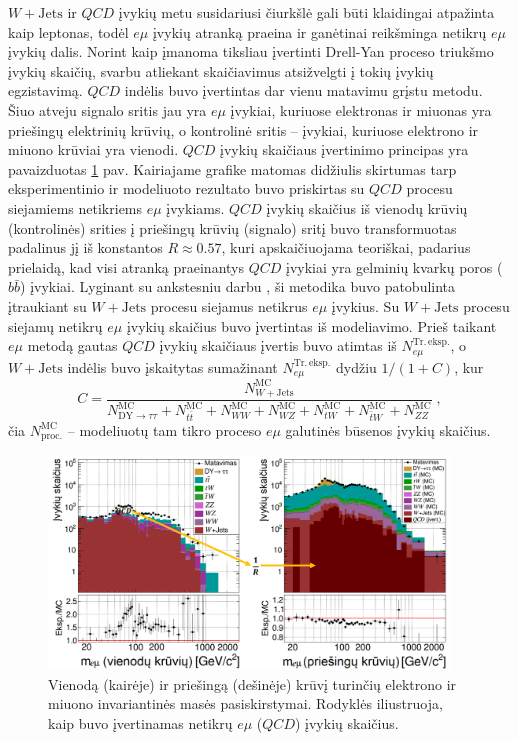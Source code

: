 \documentclass[a4paper, 12pt, oneside]{article}
\newcommand{\emu}{e\mu}
\newcommand{\WJets}{W\! +\!\mathrm{Jets}}
\newcommand{\QCD}{QC\! D}
\newlength\q
\begin{document}
$\WJets$ ir $\QCD$ įvykių metu susidariusi čiurkšlė gali būti klaidingai atpažinta kaip leptonas, todėl
$\emu$ įvykių atranką praeina ir ganėtinai reikšminga netikrų $\emu$ įvykių dalis.
Norint kaip įmanoma tiksliau įvertinti Drell-Yan proceso triukšmo įvykių skaičių, svarbu atliekant skaičiavimus atsižvelgti
į tokių įvykių egzistavimą.
$\QCD$ indėlis buvo įvertintas dar vienu matavimu grįstu metodu.
Šiuo atveju signalo sritis jau yra $\emu$ įvykiai, kuriuose elektronas ir miuonas yra priešingų elektrinių
krūvių, o kontrolinė sritis -- įvykiai, kuriuose elektrono ir miuono krūviai yra vienodi.
$\QCD$ įvykių skaičiaus įvertinimo principas yra pavaizduotas \ref{fig:emuQCD} pav.
Kairiajame grafike matomas didžiulis skirtumas tarp eksperimentinio ir modeliuoto rezultato buvo
priskirtas su $\QCD$ procesu siejamiems netikriems $\emu$ įvykiams.
$\QCD$ įvykių skaičius iš vienodų krūvių (kontrolinės) srities į priešingų krūvių (signalo) sritį
buvo transformuotas padalinus jį iš konstantos $R\approx 0.57$, kuri apskaičiuojama teoriškai,
padarius prielaidą, kad visi atranką praeinantys $\QCD$ įvykiai yra gelminių kvarkų poros
($b\bar{b}$) įvykiai.
Lyginant su ankstesniu darbu \cite{MAk1}, ši metodika buvo patobulinta įtraukiant su $\WJets$ procesu siejamus netikrus $\emu$ įvykius.
Su $\WJets$ procesu siejamų netikrų $e\mu$ įvykių skaičius buvo įvertintas iš modeliavimo.
Prieš taikant $\emu$ metodą gautas $\QCD$ įvykių skaičiaus įvertis buvo atimtas iš
$N_{e\mu}^{\mathrm{Tr. \, eksp.}}$, o $W+\mathrm{Jets}$ indėlis buvo įskaitytas sumažinant
$N_{e\mu}^{\mathrm{Tr. \, eksp.}}$ dydžiu $1/(1+C)$, kur
\begin{equation*}
	C = \frac{ N_{W+\mathrm{Jets}}^{\mathrm{MC}} } { N_{\mathrm{DY}\rightarrow\tau\tau}^{\mathrm{MC}} + 
	N_{t\bar{t}}^{\mathrm{MC}} + N_{WW}^{\mathrm{MC}} + N_{WZ}^{\mathrm{MC}} + N_{tW}^{\mathrm{MC}} + N_{\bar{t}W}^{\mathrm{MC}} +
	N_{ZZ}^{\mathrm{MC}} } \; ,
\end{equation*}
čia $N^{\mathrm{MC}}_{\mathrm{proc.}}$ -- modeliuotų tam tikro proceso $\emu$ galutinės būsenos įvykių skaičius.

\begin{figure}[H]
	\includegraphics[width=0.95\textwidth]{emuQCDest.png}
	\vspace{-0.2cm}
	\caption{\label{fig:emuQCD} Vienodą (kairėje) ir priešingą (dešinėje) krūvį turinčių elektrono ir
	miuono invariantinės masės pasiskirstymai.
	Rodyklės iliustruoja, kaip buvo įvertinamas netikrų $\emu$ ($\QCD$) įvykių skaičius.
	}
\end{figure}
\end{document}
